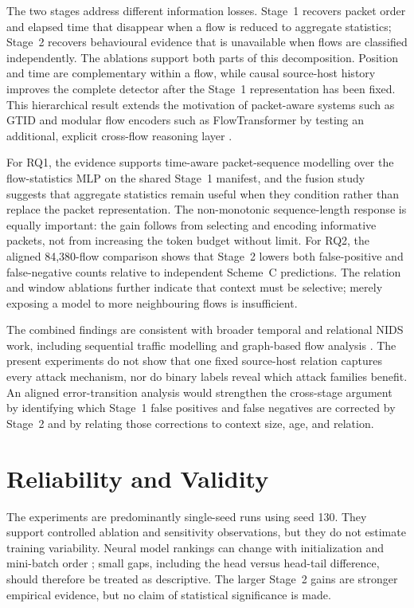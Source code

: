 \documentclass[11pt,fleqn]{report}
\begin{document}
The two stages address different information losses. Stage~1 recovers packet
order and elapsed time that disappear when a flow is reduced to aggregate
statistics; Stage~2 recovers behavioural evidence that is unavailable when
flows are classified independently. The ablations support both parts of this
decomposition. Position and time are complementary within a flow, while causal
source-host history improves the complete detector after the Stage~1
representation has been fixed. This hierarchical result extends the motivation
of packet-aware systems such as GTID and modular flow encoders such as
FlowTransformer by testing an additional, explicit cross-flow reasoning layer
\cite{Han2023GTID,Manocchio2024FlowTransformer}.

For RQ1, the evidence supports time-aware packet-sequence modelling over the
flow-statistics MLP on the shared Stage~1 manifest, and the fusion study suggests
that aggregate statistics remain useful when they condition rather than replace
the packet representation. The non-monotonic sequence-length response is equally
important: the gain follows from selecting and encoding informative packets, not
from increasing the token budget without limit. For RQ2, the aligned 84,380-flow
comparison shows that Stage~2 lowers both false-positive and false-negative
counts relative to independent Scheme~C predictions. The relation and window
ablations further indicate that context must be selective; merely exposing a
model to more neighbouring flows is insufficient.

The combined findings are consistent with broader temporal and relational NIDS
work, including sequential traffic modelling and graph-based flow analysis
\cite{LiuPatras2022NetSentry,Deng2023FlowTopology,Xu2024SSLGNN}. The present
experiments do not show that one fixed source-host relation captures every
attack mechanism, nor do binary labels reveal which attack families benefit.
An aligned error-transition analysis would strengthen the cross-stage argument
by identifying which Stage~1 false positives and false negatives are corrected
by Stage~2 and by relating those corrections to context size, age, and relation.

\section{Reliability and Validity}
\label{subsec:results_reliability}

The experiments are predominantly single-seed runs using seed 130. They support
controlled ablation and sensitivity observations, but they do not estimate
training variability. Neural model rankings can change with initialization and
mini-batch order \cite{ReimersGurevych2017,Bouthillier2021Variance}; small gaps,
including the head versus head-tail difference, should therefore be treated as
descriptive. The larger Stage~2 gains are stronger empirical evidence, but no
claim of statistical significance is made.
\end{document}
